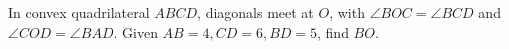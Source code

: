 In convex quadrilateral $ABCD$, diagonals meet at $O$, with $\angle BOC=\angle BCD$ and $\angle COD=\angle BAD$. Given $AB=4,CD=6,BD=5$, find $BO$.
